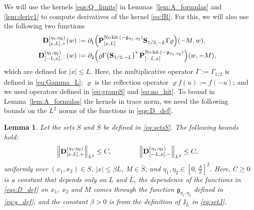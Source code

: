 \documentclass[oneside,final,11pt]{amsart}
\newtheorem{lem}[thm]{Lemma}
\theoremstyle{definition}
\newcommand\nohit{\uptext{No\! hit}}
\newcommand{\fg}{\mathfrak{g}}
\newcommand{\bJ}{\mathsf{J}}
\newcommand{\1}[1]{\mathbf{1}_{#1}}
\newcommand{\uptext}[1]{\text{\upshape{#1}}}
\newcommand{\fT}{\mathbf{S}}
\newcommand{\fx}{x}
\newcommand{\fM}{M}
\newcommand{\fD}{\mathbf{D}}
\newcommand{\fP}{\mathbf{P}}
\numberwithin{equation}{section}
\begin{document}
We will use the kernels \eqref{eqs:Q_limits} in Lemmas~\ref{lem:A_formulas} and \ref{lem:deriv1} to compute derivatives of the kernel \eqref{eq:fR}. For this, we will also use the following two functions
\begin{subequations}\label{eqs:D_def}
\begin{align}
\fD^{(\eta_1; \eta_2)}_{[\fx, L], +}(w) &:= \partial_{1} \Bigl(\fP_{[\fx, L]}^{\nohit\,(-\fg_{\eta_1, \eta_2})} \fT_{1/2,-L} \Gamma \varrho\Bigr) (-\fM, w),\label{eq:D1_def}\\
\fD^{(\eta_1; \eta_2)}_{[-L, \fx], -}(w) &:= \partial_{2} \Bigl(\varrho \Gamma \bigl(\fT_{1/2,-L}\bigr)^*\, \fP_{[-L, \fx]}^{\nohit\,(-\fg_{\eta_1, \eta_2})}\Bigr) (w, -\fM),\label{eq:D2_def}
\end{align}
\end{subequations}
which are defined for $|\fx| \leq L$. Here, the multiplicative operator $\Gamma := \Gamma_{1/2}$ is defined in \eqref{eq:Gamma_L}; $\varrho$ is the reflection operator $\varrho f(u) := f(-u)$; and we used operators defined in \eqref{eq:groupS} and \eqref{eq:no_hit}. To bound in Lemma~\ref{lem:A_formulas} the kernels in trace norm, we need the following bounds on the $L^2$ norms of the functions in  \eqref{eqs:D_def}.

\begin{lem}\label{lem:D_bounds}
Let the sets $S$ and $\bar S$ be defined in \eqref{eq:setsS}. The following bounds hold:
\begin{equation}\label{eqs:D_bounds}
\Bigl\| \fD^{(\eta_1; \eta_2)}_{[\fx, L], +} \Bigr\|_{L^2} \leq C, \qquad\qquad \Bigl\| \fD^{(\eta_1; \eta_2)}_{[-L, \fx], -} \Bigr\|_{L^2} \leq C,
\end{equation}
uniformly over $(\fx_1, \fx_2) \in S$, $|\fx| \leq \beta L$, $\fM \in \bar S$, and $\eta_1, \eta_2 \in [0, \frac{A}{2}]^2$. Here, $C \geq 0$ is a constant that depends only on $L$ and $\bar L$, the dependence of the functions in \eqref{eqs:D_def} on $x_1$, $x_2$ and $M$ comes through the function $\fg_{\eta_1, \eta_2}$ defined in  \eqref{eq:g_def}, and the constant $\beta > 0$ is from the definition of $\bJ_{L}$ in \eqref{eq:setJ}.
\end{lem}
\end{document}
